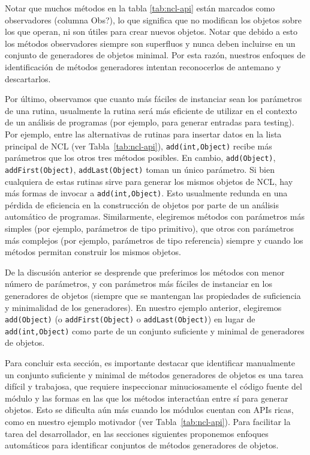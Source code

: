 Notar que muchos métodos en la tabla \ref{tab:ncl-api} están marcados como observadores (columna Obs?), lo que significa que no modifican los objetos sobre los que operan, ni son útiles para crear nuevos objetos. Notar que debido a esto los métodos observadores siempre son superfluos y nunca deben incluirse en un conjunto de generadores de objetos minimal. Por esta razón, nuestros enfoques de identificación de métodos generadores intentan reconocerlos de antemano y descartarlos.

Por último, observamos que cuanto más fáciles de instanciar sean los parámetros de una rutina, usualmente la rutina será más eficiente de utilizar en el contexto de un análisis de programas (por ejemplo, para generar entradas para testing). Por ejemplo, entre las alternativas de rutinas para insertar datos en
la lista principal de NCL (ver Tabla~\ref{tab:ncl-api}), \texttt{add(int,Object)} recibe más parámetros que los otros tres métodos posibles. En cambio, \texttt{add(Object)}, \texttt{addFirst(Object)}, \texttt{addLast(Object)} toman un único parámetro. Si bien cualquiera de estas rutinas sirve para generar los mismos objetos de NCL, hay más formas de invocar a \texttt{add(int,Object)}. Esto usualmente redunda en una pérdida de eficiencia en la construcción de objetos por parte de un análisis automático de programas. Similarmente, elegiremos métodos con parámetros más simples (por ejemplo, parámetros de tipo primitivo), que otros con parámetros más complejos (por ejemplo, parámetros de tipo referencia) siempre y cuando los métodos permitan construir los mismos objetos.

De la discusión anterior se desprende que preferimos los métodos con menor número de parámetros, y con parámetros más fáciles de instanciar en los generadores de objetos (siempre que se mantengan las propiedades de suficiencia y minimalidad de los generadores). En nuestro ejemplo anterior, elegiremos \texttt{add(Object)} (o \texttt{addFirst(Object)} o \texttt{addLast(Object)}) en lugar de \texttt{add(int,Object)} como parte de un conjunto suficiente y minimal de generadores de objetos.

Para concluir esta sección, es importante destacar que identificar manualmente un conjunto suficiente y minimal de métodos generadores de objetos es una tarea difícil y trabajosa, que requiere inspeccionar minuciosamente el código fuente del módulo y las formas en las que los métodos interactúan entre sí para generar objetos. Esto se dificulta aún más cuando los módulos cuentan con APIs ricas, como en nuestro ejemplo motivador (ver Tabla~\ref{tab:ncl-api}). 
Para facilitar la tarea del desarrollador, en las secciones siguientes proponemos enfoques automáticos para identificar conjuntos de métodos generadores de objetos.

